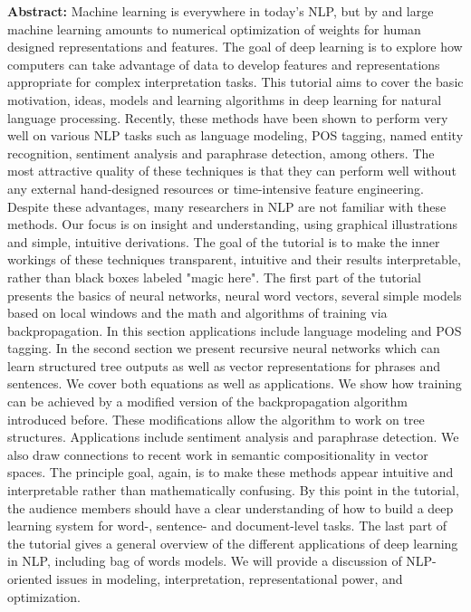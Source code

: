 \noindent
{\bfseries Abstract:} Machine learning is everywhere in today's NLP, but by and large machine learning amounts to numerical optimization of weights for human designed representations and features. The goal of deep learning is to explore how computers can take advantage of data to develop features and representations appropriate for complex interpretation tasks. This tutorial aims to cover the basic motivation, ideas, models and learning algorithms in deep learning for natural language processing. Recently, these methods have been shown to perform very well on various NLP tasks such as language modeling, POS tagging, named entity recognition, sentiment analysis and paraphrase detection, among others. The most attractive quality of these techniques is that they can perform well without any external hand-designed resources or time-intensive feature engineering. Despite these advantages, many researchers in NLP are not familiar with these methods. Our focus is on insight and understanding, using graphical illustrations and simple, intuitive derivations. The goal of the tutorial is to make the inner workings of these techniques transparent, intuitive and their results interpretable, rather than black boxes labeled "magic here". The first part of the tutorial presents the basics of neural networks, neural word vectors, several simple models based on local windows and the math and algorithms of training via backpropagation. In this section applications include language modeling and POS tagging. In the second section we present recursive neural networks which can learn structured tree outputs as well as vector representations for phrases and sentences. We cover both equations as well as applications. We show how training can be achieved by a modified version of the backpropagation algorithm introduced before. These modifications allow the algorithm to work on tree structures. Applications include sentiment analysis and paraphrase detection. We also draw connections to recent work in semantic compositionality in vector spaces. The principle goal, again, is to make these methods appear intuitive and interpretable rather than mathematically confusing. By this point in the tutorial, the audience members should have a clear understanding of how to build a deep learning system for word-, sentence- and document-level tasks. The last part of the tutorial gives a general overview of the different applications of deep learning in NLP, including bag of words models. We will provide a discussion of NLP-oriented issues in modeling, interpretation, representational power, and optimization.
